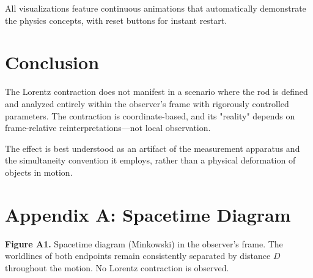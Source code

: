 \documentclass[11pt]{article}
\begin{document}
All visualizations feature continuous animations that automatically demonstrate the physics concepts, with reset buttons for instant restart.

\section{Conclusion}

The Lorentz contraction does not manifest in a scenario where the rod is defined and analyzed entirely within the observer's frame with rigorously controlled parameters. The contraction is coordinate-based, and its "reality" depends on frame-relative reinterpretations—not local observation.

The effect is best understood as an artifact of the measurement apparatus and the simultaneity convention it employs, rather than a physical deformation of objects in motion.

\newpage
\appendix
\section*{Appendix A: Spacetime Diagram}

\begin{center}
\end{center}

\textbf{Figure A1.} Spacetime diagram (Minkowski) in the observer’s frame. The worldlines of both endpoints remain consistently separated by distance $D$ throughout the motion. No Lorentz contraction is observed.
\end{document}
